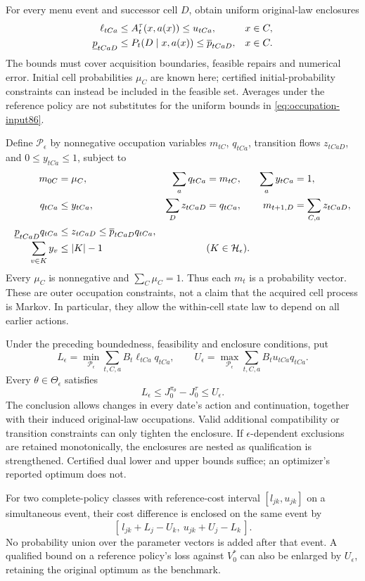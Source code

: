 For every menu event and successor cell $D$, obtain uniform original-law enclosures
\begin{align}\label{eq:occupation-input86}
 \ell_{tCa}&\le A_t^\tau(x,a(x))\le u_{tCa}, &&x\in C,\notag\\
 \underline p_{tCaD}&\le P_t(D\mid x,a(x))\le\overline p_{tCaD}, &&x\in C.
\end{align}
The bounds must cover acquisition boundaries, feasible repairs and numerical error. Initial cell probabilities $\mu_C$ are known here; certified initial-probability constraints can instead be included in the feasible set. Averages under the reference policy are not substitutes for the uniform bounds in \eqref{eq:occupation-input86}.

Define $\mathcal P_\epsilon$ by nonnegative occupation variables $m_{tC}$, $q_{tCa}$, transition flows $z_{tCaD}$, and $0\le y_{tCa}\le1$, subject to
\begin{align}\label{eq:occupation-polytope86}
 m_{0C}&=\mu_C,& \sum_a q_{tCa}&=m_{tC},& \sum_a y_{tCa}&=1,\notag\\
 q_{tCa}&\le y_{tCa},& \sum_Dz_{tCaD}&=q_{tCa},&
 m_{t+1,D}&=\sum_{C,a}z_{tCaD},\notag\\
 \underline p_{tCaD}q_{tCa}&\le z_{tCaD}\le\overline p_{tCaD}q_{tCa},&&&\notag\\[-2pt]
 \sum_{v\in K}y_v&\le |K|-1 &&(K\in\mathcal H_\epsilon).&&
\end{align}
Every $\mu_C$ is nonnegative and $\sum_C\mu_C=1$. Thus each $m_t$ is a probability vector. These are outer occupation constraints, not a claim that the acquired cell process is Markov. In particular, they allow the within-cell state law to depend on all earlier actions.

\begin{theorem}\label{thm:occupation86}
Under the preceding boundedness, feasibility and enclosure conditions, put
\begin{equation}\label{eq:recursive-band86}
 L_\epsilon=\min_{\mathcal P_\epsilon}\sum_{t,C,a}B_t\ell_{tCa}q_{tCa},\qquad
 U_\epsilon=\max_{\mathcal P_\epsilon}\sum_{t,C,a}B_tu_{tCa}q_{tCa}.
\end{equation}
Every $\theta\in\Theta_\epsilon$ satisfies
\[
 L_\epsilon\le J_0^{\pi_\theta}-J_0^\tau\le U_\epsilon.
\]
The conclusion allows changes in every date's action and continuation, together with their induced original-law occupations. Valid additional compatibility or transition constraints can only tighten the enclosure. If $\epsilon$-dependent exclusions are retained monotonically, the enclosures are nested as qualification is strengthened. Certified dual lower and upper bounds suffice; an optimizer's reported optimum does not.

For two complete-policy classes with reference-cost interval $[l_{jk},u_{jk}]$ on a simultaneous event, their cost difference is enclosed on the same event by
\[
 [\,l_{jk}+L_j-U_k,\ u_{jk}+U_j-L_k\,].
\]
No probability union over the parameter vectors is added after that event. A qualified bound on a reference policy's loss against $V_0^*$ can also be enlarged by $U_\epsilon$, retaining the original optimum as the benchmark.
\end{theorem}

